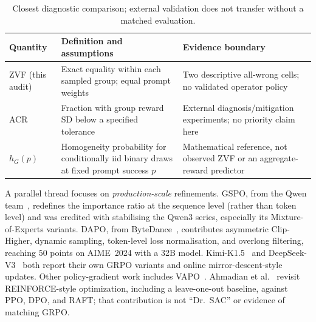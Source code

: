 \begin{table}[htbp]
\centering\small
\caption{Closest diagnostic comparison; external validation does not transfer
without a matched evaluation.}
\label{tab:diagnostic-prior}
\begin{tabular}{p{.17\linewidth}p{.34\linewidth}p{.38\linewidth}}
\toprule
Quantity & Definition and assumptions & Evidence boundary \\
\midrule
ZVF (this audit) & Exact equality within each sampled group; equal prompt weights & Two descriptive all-wrong cells; no validated operator policy \\
ACR~\citep{he2026advantage} & Fraction with group reward SD below a specified tolerance & External diagnosis/mitigation experiments; no priority claim here \\
$h_G(p)$ & Homogeneity probability for conditionally iid binary draws at fixed prompt success $p$ & Mathematical reference, not observed ZVF or an aggregate-reward predictor \\
\bottomrule
\end{tabular}
\end{table}

A parallel thread focuses on \emph{production-scale} refinements. GSPO, from
the Qwen team~\cite{qwen2025gspo}, redefines the importance ratio at the
sequence level (rather than token level) and was credited with stabilising the
Qwen3 series, especially its Mixture-of-Experts variants. DAPO, from
ByteDance~\cite{yu2025dapo}, contributes asymmetric Clip-Higher, dynamic
sampling, token-level loss normalisation, and overlong filtering, reaching
$50$ points on AIME~2024 with a 32B model. Kimi-K1.5~\cite{team2025kimi15, team2025kimik2} and DeepSeek-V3~\cite{deepseek2024v3} both report their own
GRPO variants and online mirror-descent-style updates. Other policy-gradient work includes VAPO~\cite{bytedance2025vapo}.
Ahmadian et al.~\cite{ahmadian2024backtobasics} revisit REINFORCE-style
optimization, including a leave-one-out baseline, against PPO, DPO, and RAFT;
that contribution is not ``Dr.~SAC'' or evidence of matching GRPO.

